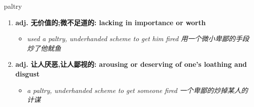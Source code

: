 
\begin{frame}
{\huge paltry}
\begin{center}
\begin{enumerate}\Large
  \item \textbf{adj. 无价值的;微不足道的: lacking in importance or worth}
  \begin{itemize}
    \item \em{\Large{used a paltry, underhanded scheme to get him fired 用一个微小卑鄙的手段炒了他鱿鱼}}
  \end{itemize}
  \item \textbf{adj. 让人厌恶,让人鄙视的: arousing or deserving of one's loathing and disgust}
  \begin{itemize}
    \item \em{\Large{a paltry, underhanded scheme to get someone fired 一个卑鄙的炒掉某人的计谋}}
  \end{itemize}
\end{enumerate}
\end{center}
\end{frame}
